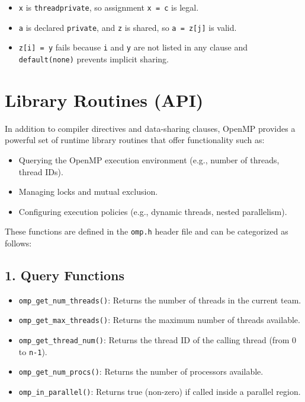\documentclass[12pt]{book}
\begin{document}
\begin{itemize}
    \item \texttt{x} is \texttt{threadprivate}, so assignment \texttt{x = c} is legal.
    \item \texttt{a} is declared \texttt{private}, and \texttt{z} is shared, so \texttt{a = z[j]} is valid.
    \item \texttt{z[i] = y} fails because \texttt{i} and \texttt{y} are not listed in any clause and \texttt{default(none)} prevents implicit sharing.
\end{itemize}


\section{Library Routines (API)}

In addition to compiler directives and data-sharing clauses, OpenMP provides a powerful set of runtime library routines that offer functionality such as:

\begin{itemize}
    \item Querying the OpenMP execution environment (e.g., number of threads, thread IDs).
    \item Managing locks and mutual exclusion.
    \item Configuring execution policies (e.g., dynamic threads, nested parallelism).
\end{itemize}

These functions are defined in the \texttt{omp.h} header file and can be categorized as follows:

\subsection{1. Query Functions}
\begin{itemize}
    \item \texttt{omp\_get\_num\_threads()}: Returns the number of threads in the current team.
    \item \texttt{omp\_get\_max\_threads()}: Returns the maximum number of threads available.
    \item \texttt{omp\_get\_thread\_num()}: Returns the thread ID of the calling thread (from 0 to \texttt{n-1}).
    \item \texttt{omp\_get\_num\_procs()}: Returns the number of processors available.
    \item \texttt{omp\_in\_parallel()}: Returns true (non-zero) if called inside a parallel region.
\end{itemize}
\end{document}
